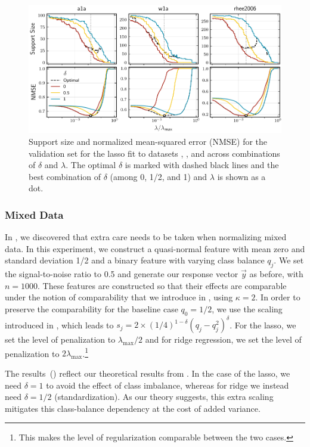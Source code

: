 \begin{figure}[htpb]
  \centering
  \includegraphics[]{plots/hyperopt_paths.pdf}
  \caption{%
    Support size and normalized mean-squared error (NMSE) for the validation set for the lasso fit to datasets , , and  across combinations of \(\delta\) and \(\lambda\). The optimal \(\delta\) is marked with dashed black lines and the best combination of \(\delta\) (among 0, 1/2, and 1) and \(\lambda\) is shown as a dot.
  }
  \label{fig:hyperopt-support}
\end{figure}

\subsubsection{Mixed Data}\label{sec:experiments-mixed-data}

In , we discovered that extra care needs to be taken when normalizing
mixed data. In this experiment, we construct a quasi-normal feature with mean zero and
standard deviation 1/2 and a binary feature with varying class balance \(q_j\). We set the
signal-to-noise ratio to 0.5 and generate our response vector \(\vec{y}\) as before, with
\(n = \num{1000}\). These features are constructed so that their effects are comparable
under the notion of comparability that we introduce in , using
\(\kappa = 2\). In order to preserve the comparability for the baseline case \(q_0 = 1/2\),
we use the scaling introduced in , which leads to \(s_j = 2 \times
(1/4)^{1-\delta}(q_j-q_j^2)^\delta\). For the lasso, we set the level of penalization to
\(\lambda_\text{max}/2\) and for ridge regression, we set the level of penalization to
\(2\lambda_\text{max}\).\footnote{This makes the level of regularization comparable between
  the two cases.}

The results~() reflect our theoretical results from
. In the case of the lasso, we need \(\delta =1\) to avoid the effect of
class imbalance, whereas for ridge we instead need \(\delta =1/2\) (standardization). As
our theory suggests, this extra scaling mitigates this class-balance dependency at the cost
of added variance.


